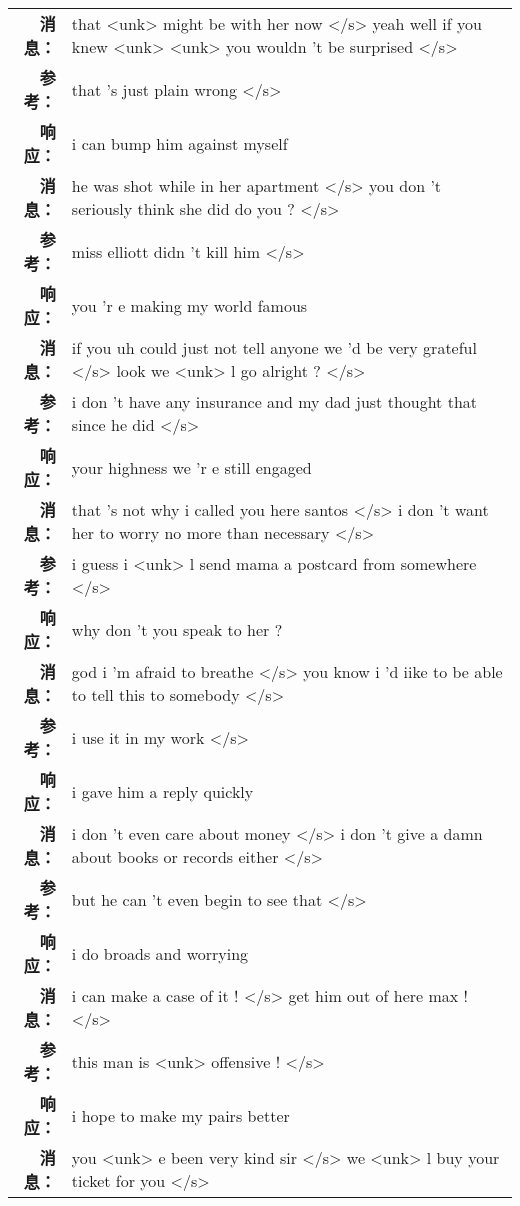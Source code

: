 \begin{tabularx}{\textwidth}{@{}rX@{}}%
\toprule%
\midrule%
\textbf{消息：}&that <unk> might be with her now </s> yeah well if you knew <unk> <unk> you wouldn 't be surprised  </s>\\%
\textbf{参考：}& that 's just plain wrong </s>\\%
\textbf{响应：}&i can bump him against myself\\%
\midrule%
\textbf{消息：}&he was shot while in her apartment </s> you don 't seriously think she did do you ?  </s>\\%
\textbf{参考：}& miss elliott didn 't kill him </s>\\%
\textbf{响应：}&you 'r e making my world famous\\%
\midrule%
\textbf{消息：}&if you uh could just not tell anyone we 'd be very grateful </s> look we <unk> l go alright ?  </s>\\%
\textbf{参考：}& i don 't have any insurance and my dad just thought that since he did </s>\\%
\textbf{响应：}&your highness we 'r e still engaged\\%
\midrule%
\textbf{消息：}&that 's not why i called you here santos </s> i don 't want her to worry no more than necessary  </s>\\%
\textbf{参考：}& i guess i <unk> l send mama a postcard from somewhere </s>\\%
\textbf{响应：}&why don 't you speak to her ?\\%
\midrule%
\textbf{消息：}&god i 'm afraid to breathe </s> you know i 'd iike to be able to tell this to somebody  </s>\\%
\textbf{参考：}& i use it in my work </s>\\%
\textbf{响应：}&i gave him a reply quickly\\%
\midrule%
\textbf{消息：}&i don 't even care about money </s> i don 't give a damn about books or records either  </s>\\%
\textbf{参考：}& but he can 't even begin to see that </s>\\%
\textbf{响应：}&i do broads and worrying\\%
\midrule%
\textbf{消息：}&i can make a case of it ! </s> get him out of here max !  </s>\\%
\textbf{参考：}& this man is <unk> offensive ! </s>\\%
\textbf{响应：}&i hope to make my pairs better\\%
\midrule%
\textbf{消息：}&you <unk> e been very kind sir </s> we <unk> l buy your ticket for you  </s>\\%

\end{tabularx}
